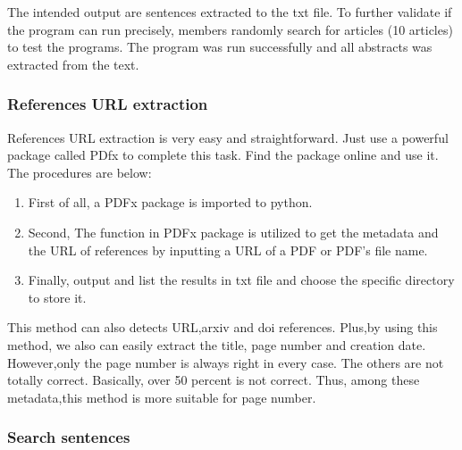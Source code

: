 The intended output are sentences extracted to the txt file. 
To further validate if the program can run precisely, members randomly search for articles (10 articles) to test the programs. 
The program was run successfully and all abstracts was extracted from the text.

\subsubsection{References URL extraction}

References URL extraction is very easy and straightforward. 
Just use a powerful package called PDfx to complete this task. 
Find the package online and use it. The procedures are below:

\begin{enumerate}
	
	\item First of all, a PDFx package is imported to python.
	\item Second, The function in PDFx package is utilized to get the metadata and the URL of references by inputting a URL of a PDF or PDF's file name.
	\item Finally, output and list the results in txt file and choose the specific directory to store it.
	
\end{enumerate}

This method can also detects URL,arxiv and doi references. 
Plus,by using this method, we also can easily extract the title, page number and creation date. 
However,only the page number is always right in every case. 
The others are not totally correct. 
Basically, over 50 percent is not correct. Thus, among these metadata,this method is more suitable for page number. 

\subsubsection{Search sentences}

